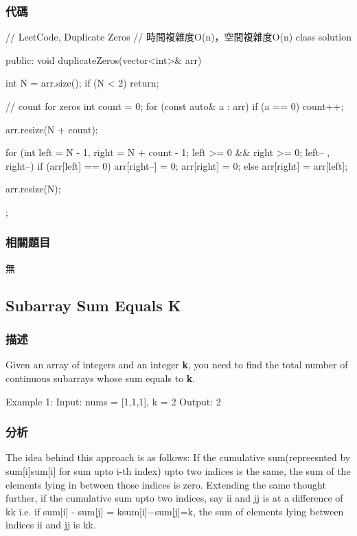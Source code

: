 \subsubsection{代碼}
\begin{Code}
// LeetCode, Duplicate Zeros
// 時間複雜度O(n)，空間複雜度O(n)
class solution{
public:
    void duplicateZeros(vector<int>& arr) {
        int N = arr.size();
        if (N < 2) return;

        // count for zeros
        int count = 0;
        for (const auto& a : arr) if (a == 0) count++;

        arr.resize(N + count);

        for (int left = N - 1, right = N + count - 1;
                 left >= 0 && right >= 0; left-- , right--) {
            if (arr[left] == 0) {
                arr[right--] = 0;
                arr[right] = 0;
            }
            else
                arr[right] = arr[left];
        }

        arr.resize(N);
    }
};
\end{Code}

\subsubsection{相關題目}
\begindot
\item 無
\myenddot

\subsection{Subarray Sum Equals K}
\label{sec:subarray-sum-equals-k}


\subsubsection{描述}
Given an array of integers and an integer \textbf{k}, you need to find the total number of continuous subarrays whose sum equals to \textbf{k}.

\begin{Code}
  Example 1:
  Input: nums = [1,1,1], k = 2
  Output: 2
\end{Code}

\subsubsection{分析}
The idea behind this approach is as follows: If the cumulative sum(repreesnted by sum[i]sum[i] for sum upto i-th index) upto two indices is the same, the sum of the elements lying in between those indices is zero. Extending the same thought further, if the cumulative sum upto two indices, say ii and jj is at a difference of kk i.e. if sum[i] - sum[j] = ksum[i]−sum[j]=k, the sum of elements lying between indices ii and jj is kk.

